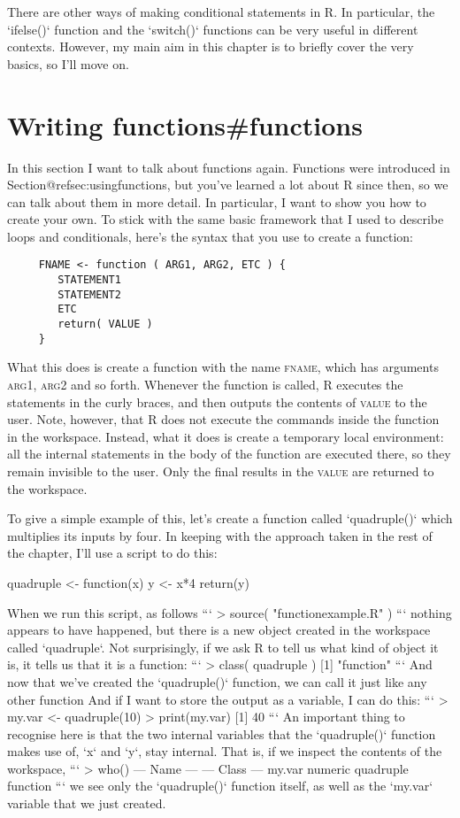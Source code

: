 There are other ways of making conditional statements in R. In particular, the `ifelse()` function and the `switch()` functions can be very useful in different contexts. However, my main aim in this chapter is to briefly cover the very basics, so I'll move on.





\section{Writing functions{#functions}}

In this section I want to talk about functions again. Functions were introduced in Section@refsec:usingfunctions, but you've learned a lot about R since then, so we can talk about them in more detail. In particular, I want to show you how to create your own. To stick with the same basic framework that I used to describe loops and conditionals, here's the syntax that you use to create a function:
\begin{verbatim}
     FNAME <- function ( ARG1, ARG2, ETC ) {
        STATEMENT1
        STATEMENT2
        ETC
        return( VALUE )
     }
\end{verbatim} 
What this does is create a function with the name \textsc{fname}, which has arguments \textsc{arg1}, \textsc{arg2} and so forth. Whenever the function is called, R executes the statements in the curly braces, and then outputs the contents of \textsc{value} to the user. Note, however, that R does not execute the commands inside the function in the workspace. Instead, what it does is create a temporary local environment: all the internal statements in the body of the function are executed there, so they remain invisible to the user. Only the final results in the \textsc{value} are returned to the workspace.

To give a simple example of this, let's create a function called `quadruple()` which multiplies its inputs by four. In keeping with the approach taken in the rest of the chapter, I'll use a script to do this:

\begin{script}
quadruple <- function(x) {
  y <- x*4
  return(y)
} 
\end{script}
When we run this script, as follows
```
> source( "functionexample.R" )
```
nothing appears to have happened, but there is a new object created in the workspace called `quadruple`. Not surprisingly, if we ask R to tell us what kind of object it is, it tells us that it is a function:
```
> class( quadruple )
[1] "function"
```
And now that we've created the `quadruple()` function, we can call it just like any other function 
And if I want to store the output as a variable, I can do this:
```
> my.var <- quadruple(10)
> print(my.var)
[1] 40
```
An important thing to recognise here is that the two internal variables that the `quadruple()` function makes use of, `x` and `y`, stay internal. That is, if we inspect the contents of the workspace, 
```
> who()
   --- Name ---   --- Class ---
   my.var         numeric      
   quadruple      function  
```
we see only the `quadruple()` function itself, as well as the `my.var` variable that we just created. 

